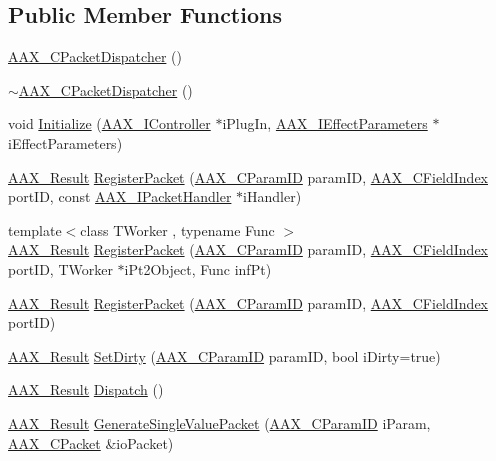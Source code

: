 \subsection*{Public Member Functions}
\begin{DoxyCompactItemize}
\item 
\mbox{\hyperlink{a01529_a1b9b60206849807c11045fb865a4dd49}{A\+A\+X\+\_\+\+C\+Packet\+Dispatcher}} ()
\item 
\mbox{\hyperlink{a01529_a1eb3ce17e895e30106316c33bc44307f}{$\sim$\+A\+A\+X\+\_\+\+C\+Packet\+Dispatcher}} ()
\item 
void \mbox{\hyperlink{a01529_abc64d59b8b9f652013ccf848987ea797}{Initialize}} (\mbox{\hyperlink{a01789}{A\+A\+X\+\_\+\+I\+Controller}} $\ast$i\+Plug\+In, \mbox{\hyperlink{a01825}{A\+A\+X\+\_\+\+I\+Effect\+Parameters}} $\ast$i\+Effect\+Parameters)
\item 
\mbox{\hyperlink{a00392_a4d8f69a697df7f70c3a8e9b8ee130d2f}{A\+A\+X\+\_\+\+Result}} \mbox{\hyperlink{a01529_a1848f0bfa473b54e9ee8e32872c89cb1}{Register\+Packet}} (\mbox{\hyperlink{a00392_a1440c756fe5cb158b78193b2fc1780d1}{A\+A\+X\+\_\+\+C\+Param\+ID}} param\+ID, \mbox{\hyperlink{a00392_ae807f8986143820cfb5d6da32165c9c7}{A\+A\+X\+\_\+\+C\+Field\+Index}} port\+ID, const \mbox{\hyperlink{a01521}{A\+A\+X\+\_\+\+I\+Packet\+Handler}} $\ast$i\+Handler)
\item 
{\footnotesize template$<$class T\+Worker , typename Func $>$ }\\\mbox{\hyperlink{a00392_a4d8f69a697df7f70c3a8e9b8ee130d2f}{A\+A\+X\+\_\+\+Result}} \mbox{\hyperlink{a01529_af83ca953818597116ef11a345eef2e36}{Register\+Packet}} (\mbox{\hyperlink{a00392_a1440c756fe5cb158b78193b2fc1780d1}{A\+A\+X\+\_\+\+C\+Param\+ID}} param\+ID, \mbox{\hyperlink{a00392_ae807f8986143820cfb5d6da32165c9c7}{A\+A\+X\+\_\+\+C\+Field\+Index}} port\+ID, T\+Worker $\ast$i\+Pt2\+Object, Func inf\+Pt)
\item 
\mbox{\hyperlink{a00392_a4d8f69a697df7f70c3a8e9b8ee130d2f}{A\+A\+X\+\_\+\+Result}} \mbox{\hyperlink{a01529_a767959a133afaa2e44bfafc79d0b5c69}{Register\+Packet}} (\mbox{\hyperlink{a00392_a1440c756fe5cb158b78193b2fc1780d1}{A\+A\+X\+\_\+\+C\+Param\+ID}} param\+ID, \mbox{\hyperlink{a00392_ae807f8986143820cfb5d6da32165c9c7}{A\+A\+X\+\_\+\+C\+Field\+Index}} port\+ID)
\item 
\mbox{\hyperlink{a00392_a4d8f69a697df7f70c3a8e9b8ee130d2f}{A\+A\+X\+\_\+\+Result}} \mbox{\hyperlink{a01529_a6d4254a842eeee46a227ec761619efb5}{Set\+Dirty}} (\mbox{\hyperlink{a00392_a1440c756fe5cb158b78193b2fc1780d1}{A\+A\+X\+\_\+\+C\+Param\+ID}} param\+ID, bool i\+Dirty=true)
\item 
\mbox{\hyperlink{a00392_a4d8f69a697df7f70c3a8e9b8ee130d2f}{A\+A\+X\+\_\+\+Result}} \mbox{\hyperlink{a01529_aec68e7f8f440e394a3e4ab698a5f06f9}{Dispatch}} ()
\item 
\mbox{\hyperlink{a00392_a4d8f69a697df7f70c3a8e9b8ee130d2f}{A\+A\+X\+\_\+\+Result}} \mbox{\hyperlink{a01529_afa837e03b555f3093144838bddd558f3}{Generate\+Single\+Value\+Packet}} (\mbox{\hyperlink{a00392_a1440c756fe5cb158b78193b2fc1780d1}{A\+A\+X\+\_\+\+C\+Param\+ID}} i\+Param, \mbox{\hyperlink{a01513}{A\+A\+X\+\_\+\+C\+Packet}} \&io\+Packet)
\end{DoxyCompactItemize}


